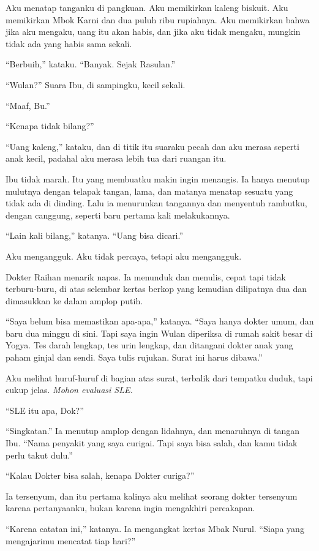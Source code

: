 \documentclass[11pt,twoside,openany]{book}
\begin{document}
Aku menatap tanganku di pangkuan. Aku memikirkan kaleng biskuit. Aku memikirkan Mbok Karni dan dua puluh ribu rupiahnya. Aku memikirkan bahwa jika aku mengaku, uang itu akan habis, dan jika aku tidak mengaku, mungkin tidak ada yang habis sama sekali.

``Berbuih,'' kataku. ``Banyak. Sejak Rasulan.''

``Wulan?'' Suara Ibu, di sampingku, kecil sekali.

``Maaf, Bu.''

``Kenapa tidak bilang?''

``Uang kaleng,'' kataku, dan di titik itu suaraku pecah dan aku merasa seperti anak kecil, padahal aku merasa lebih tua dari ruangan itu.

Ibu tidak marah. Itu yang membuatku makin ingin menangis. Ia hanya menutup mulutnya dengan telapak tangan, lama, dan matanya menatap sesuatu yang tidak ada di dinding. Lalu ia menurunkan tangannya dan menyentuh rambutku, dengan canggung, seperti baru pertama kali melakukannya.

``Lain kali bilang,'' katanya. ``Uang bisa dicari.''

Aku mengangguk. Aku tidak percaya, tetapi aku mengangguk.

Dokter Raihan menarik napas. Ia menunduk dan menulis, cepat tapi tidak terburu-buru, di atas selembar kertas berkop yang kemudian dilipatnya dua dan dimasukkan ke dalam amplop putih.

``Saya belum bisa memastikan apa-apa,'' katanya. ``Saya hanya dokter umum, dan baru dua minggu di sini. Tapi saya ingin Wulan diperiksa di rumah sakit besar di Yogya. Tes darah lengkap, tes urin lengkap, dan ditangani dokter anak yang paham ginjal dan sendi. Saya tulis rujukan. Surat ini harus dibawa.''

Aku melihat huruf-huruf di bagian atas surat, terbalik dari tempatku duduk, tapi cukup jelas. \emph{Mohon evaluasi SLE.}

``SLE itu apa, Dok?''

``Singkatan.'' Ia menutup amplop dengan lidahnya, dan menaruhnya di tangan Ibu. ``Nama penyakit yang saya curigai. Tapi saya bisa salah, dan kamu tidak perlu takut dulu.''

``Kalau Dokter bisa salah, kenapa Dokter curiga?''

Ia tersenyum, dan itu pertama kalinya aku melihat seorang dokter tersenyum karena pertanyaanku, bukan karena ingin mengakhiri percakapan.

``Karena catatan ini,'' katanya. Ia mengangkat kertas Mbak Nurul. ``Siapa yang mengajarimu mencatat tiap hari?''
\end{document}
